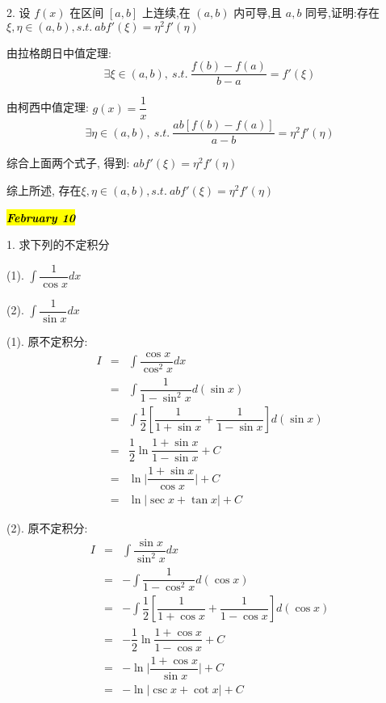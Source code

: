 2. 设 $f(x)$ 在区间 $[a,b]$ 上连续,在 $(a,b)$ 内可导,且 $a,b$ 同号,证明:存在$\xi,\eta\in(a,b),s.t.\ abf'(\xi)=\eta^{2}f'(\eta)$
\begin{solution}

	由拉格朗日中值定理:
	$$\exists \xi\in (a,b),\ s.t.\ \dfrac{f(b)-f(a)}{b-a} = f'(\xi)$$

	由柯西中值定理: $g(x) = \dfrac{1}{x}$
	$$\exists \eta\in(a,b),\ s.t.\ \dfrac{ab[f(b)-f(a)]}{a-b} = \eta^{2}f'(\eta)$$

	综合上面两个式子, 得到: $abf'(\xi) = \eta^{2}f'(\eta)$

	综上所述, 存在$\xi,\eta\in(a,b),s.t.\ abf'(\xi)=\eta^{2}f'(\eta)$
\end{solution}

\hl{\textbf{\textit{February 10}}}

1. 求下列的不定积分

(1). $\int \dfrac{1}{\cos x}dx$

(2). $\int \dfrac{1}{\sin x}dx$
\begin{solution}

	(1). 原不定积分:
	\begin{eqnarray*}
		I & = & \int \dfrac{\cos x}{\cos ^{2}x}dx\\
		  & = & \int \dfrac{1}{1-\sin^{2}x}d(\sin x)\\
		  & = & \int \dfrac{1}{2}\left[\dfrac{1}{1+\sin x}+\dfrac{1}{1-\sin x}\right]d(\sin x)\\
		  & = & \dfrac{1}{2} \ln \dfrac{1+\sin x}{1-\sin x} +C\\
		  & = & \ln \big|\dfrac{1+\sin x}{\cos x}\big| +C\\
		  & = & \ln \big|\sec x + \tan x\big| +C 
	\end{eqnarray*}

	(2). 原不定积分:
	\begin{eqnarray*}
		I & = & \int \dfrac{\sin x}{\sin ^{2}x}dx\\
		  & = & -\int \dfrac{1}{1-\cos^{2}x}d(\cos x)\\
		  & = & -\int \dfrac{1}{2}\left[\dfrac{1}{1+\cos x}+\dfrac{1}{1-\cos x}\right]d(\cos x)\\
		  & = & -\dfrac{1}{2} \ln \dfrac{1+\cos x}{1-\cos x} +C\\
		  & = & -\ln \big|\dfrac{1+\cos x}{\sin x}\big| +C\\
		  & = & -\ln \big|\csc x + \cot x\big| +C 
	\end{eqnarray*}

\end{solution}

